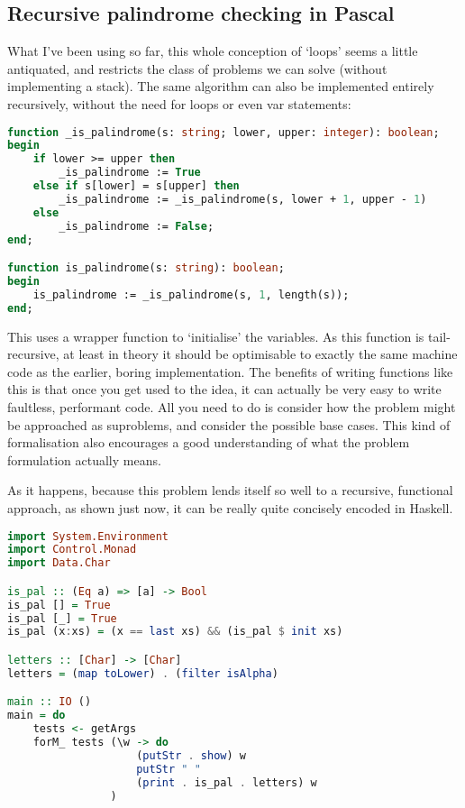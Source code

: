 \documentclass{article}
\begin{document}
    \subsection{Recursive palindrome checking in Pascal}

    What I've been using so far, this whole conception of `loops'
    seems a little antiquated, and restricts the class of problems we can solve
    (without implementing a stack). The same algorithm can also be implemented
    entirely recursively, without the need for loops or even var statements:

\begin{lstlisting}[language=Pascal, caption=Recursive palindrome function in Pascal]
function _is_palindrome(s: string; lower, upper: integer): boolean;
begin
    if lower >= upper then
        _is_palindrome := True
    else if s[lower] = s[upper] then
        _is_palindrome := _is_palindrome(s, lower + 1, upper - 1)
    else
        _is_palindrome := False;
end;

function is_palindrome(s: string): boolean;
begin
    is_palindrome := _is_palindrome(s, 1, length(s));
end;
\end{lstlisting}

    This uses a wrapper function to `initialise' the variables. As this
    function is tail-recursive, at least in theory it should be optimisable to
    exactly the same machine code as the earlier, boring implementation. The
    benefits of writing functions like this is that once you get used to the
    idea, it can actually be very easy to write faultless, performant code. All
    you need to do is consider how the problem might be approached as
    suproblems, and consider the possible base cases. This kind of
    formalisation also encourages a good understanding of what the problem
    formulation actually means.

    As it happens, because this problem lends itself so well to a recursive,
    functional approach, as shown just now, it can be really quite concisely
    encoded in Haskell.

\begin{lstlisting}[language=Haskell, caption=Palindrome function in Haskell]
import System.Environment
import Control.Monad
import Data.Char

is_pal :: (Eq a) => [a] -> Bool
is_pal [] = True
is_pal [_] = True
is_pal (x:xs) = (x == last xs) && (is_pal $ init xs)

letters :: [Char] -> [Char]
letters = (map toLower) . (filter isAlpha)

main :: IO ()
main = do
    tests <- getArgs
    forM_ tests (\w -> do
                    (putStr . show) w
                    putStr " "
                    (print . is_pal . letters) w
                )
\end{lstlisting}
\end{document}
